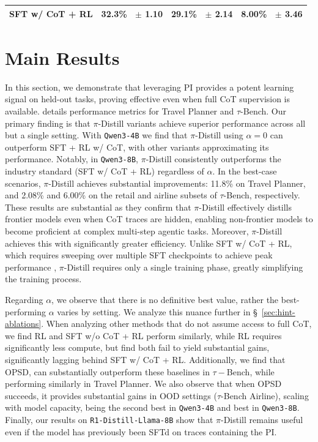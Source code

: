\documentclass[]{servicenow} %
\newcommand{\wpm}[1]{\tiny{\color{gray}~$\pm$ #1}}
\begin{document}
\begin{table}[t]
\begin{small}
{\begin{tabular}{lccc}
\midrule
SFT w/ CoT + RL 
& 32.3\% \wpm{1.10} & 29.1\% \wpm{2.14} & 8.00\% \wpm{3.46} \\
\bottomrule
\end{tabular}%
}
\end{small}
\vskip -0.1in
\end{table}
\section{Main Results}
\label{sec:main-results}

In this section, we demonstrate that leveraging PI provides a potent learning signal on held-out tasks, proving effective even when full CoT supervision is available.  details performance metrics for Travel Planner and $\tau$-Bench. Our primary finding is that $\pi$-Distill variants achieve superior performance across all but a single setting.  With \texttt{Qwen3-4B} we find that $\pi$-Distill using $\alpha=0$ can outperform SFT + RL w/ CoT, with other variants approximating its performance. Notably,  in \texttt{Qwen3-8B}, $\pi$-Distill consistently outperforms the industry standard (SFT w/ CoT + RL) regardless of $\alpha$. In the best-case scenarios, $\pi$-Distill achieves substantial improvements: 11.8\% on Travel Planner, and 2.08\% and 6.00\% on the retail and airline subsets of $\tau$-Bench, respectively.  These results are substantial as they confirm that $\pi$-Distill effectively distills frontier models even when CoT traces are hidden, enabling non-frontier models to become proficient at complex multi-step agentic tasks. Moreover, $\pi$-Distill achieves this with significantly greater efficiency. Unlike  SFT w/ CoT + RL, which requires sweeping over multiple SFT checkpoints to achieve peak performance \citep{vattikonda2025trainllmwebagent}, $\pi$-Distill requires only a single training phase, greatly simplifying the training process.

Regarding $\alpha$, we observe that there is no definitive best value, rather the best-performing $\alpha$ varies by setting. We analyze this nuance further in \S~\ref{sec:hint-ablations}. When analyzing other methods that do not assume access to full CoT, we find  RL and SFT w/o CoT + RL perform similarly, while RL requires significantly less compute, but find both fail to yield substantial gains, significantly lagging behind SFT w/ CoT + RL. Additionally, we find that OPSD, can substantially outperform these baselines in $\tau-$Bench, while performing similarly in Travel Planner. We also observe that when OPSD succeeds, it provides substantial gains in OOD settings ($\tau$-Bench Airline), scaling with model capacity, being the second best in \texttt{Qwen3-4B} and best in \texttt{Qwen3-8B}.
Finally, our results on \texttt{R1-Distill-Llama-8B} show that $\pi$-Distill remains useful even if the model has previously been SFTd on traces containing the PI.
\end{document}
